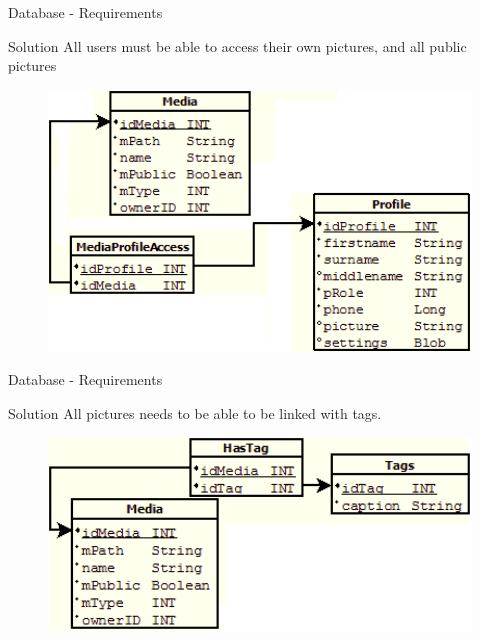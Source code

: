 \begin{frame}{Database - Requirements}
    \begin{block}{Solution}
	All users must be able to access their own pictures, and all public pictures

\begin{figure}[htbp]
	\centering
		\includegraphics[width=1.00\textwidth]{Img/DatabaseProfileMediaRelation.png}
	\label{fig:DatabaseProfileMediaRelation}
\end{figure}

   \end{block}
\end{frame}

\begin{frame}{Database - Requirements}
    \begin{block}{Solution}
	All pictures needs to be able to be linked with tags.

\begin{figure}[htbp]
	\centering
		\includegraphics[width=1.00\textwidth]{Img/DatabaseMediaTagRelation.png}
	\label{fig:DatabaseMediaTagRelation}
\end{figure}

   \end{block}
\end{frame}

